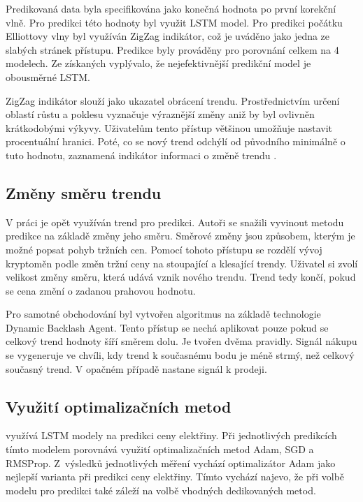 Predikovaná data byla specifikována jako konečná hodnota po první korekční vlně. 
Pro predikci této hodnoty byl využit LSTM model. 
Pro predikci počátku Elliottovy vlny byl využíván ZigZag indikátor, což je uváděno jako jedna ze slabých stránek přístupu. 
Predikce byly prováděny pro porovnání celkem na 4 modelech. Ze získaných vyplývalo, že nejefektivnější predikční model je obousměrné LSTM.

ZigZag indikátor slouží jako ukazatel obrácení trendu. 
Prostřednictvím určení oblastí růstu a poklesu vyznačuje výraznější změny aniž by byl ovlivněn krátkodobými výkyvy. 
Uživatelům tento přístup většinou umožňuje nastavit procentuální hranici. 
Poté, co se nový trend odchýlí od původního minimálně o tuto hodnotu, zaznamená indikátor informaci o změně trendu \cite{zigzag}.

\subsection{Změny směru trendu}

V práci  je opět využíván trend pro predikci. 
Autoři se snažili vyvinout metodu predikce na základě změny jeho směru.
Směrové změny jsou způsobem, kterým je možné popsat pohyb tržních cen.
Pomocí tohoto přístupu se rozdělí vývoj kryptoměn podle změn tržní ceny na stoupající a klesající trendy. 
Uživatel si zvolí velikost změny směru, která udává vznik nového trendu. 
Trend tedy končí, pokud se cena změní o zadanou prahovou hodnotu. 

Pro samotné obchodování byl vytvořen algoritmus na základě technologie Dynamic Backlash Agent. 
Tento přístup se nechá aplikovat pouze pokud se celkový trend hodnoty šíří směrem dolu. 
Je tvořen dvěma pravidly. 
Signál nákupu se vygeneruje ve chvíli, kdy trend k současnému bodu je méně strmý, než celkový současný trend. 
V opačném případě nastane signál k prodeji.

\subsection{Využití optimalizačních metod}

 \cite{electro} využívá LSTM modely na predikci ceny elektřiny. 
Při jednotlivých predikcích tímto modelem porovnává využití optimalizačních metod Adam, SGD a RMSProp. 
Z~výsledků jednotlivých měření vychází optimalizátor Adam jako nejlepší varianta při predikci ceny elektřiny.
Tímto vychází najevo, že při volbě modelu pro predikci také záleží na volbě vhodných dedikovaných metod.

